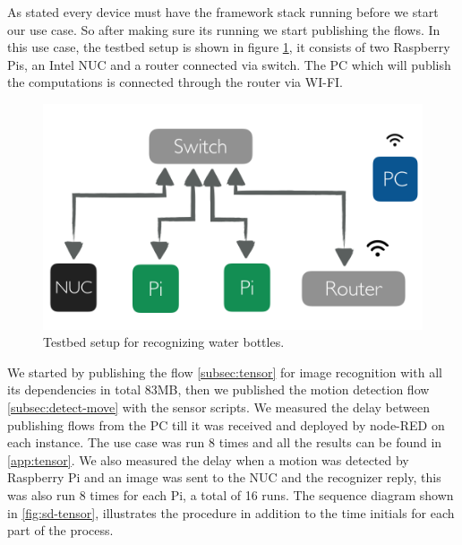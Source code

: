 \noindent As stated every device must have the framework stack running before we start our use case. So after making sure its running we start publishing the flows. In this use case, the testbed setup is shown in figure \ref{fig:tb-tensor}, it consists of two Raspberry Pis, an Intel NUC and a router connected via switch. The PC which will publish the computations is connected through the router via WI-FI. 
 \begin{figure}[H]
	\centering
	\includegraphics[scale=0.6]{images/tb-tensor.png}
	\caption{Testbed setup for recognizing water bottles.}
	\label{fig:tb-tensor}
\end{figure} 

\noindent We started by publishing the flow \ref{subsec:tensor} for  image recognition with all its dependencies in total 83MB, then we published the motion detection flow \ref{subsec:detect-move} with the sensor scripts. We measured the delay between publishing flows from the PC till it was received and deployed by node-RED on each instance. The use case was run 8 times and all the results can be found in \ref{app:tensor}. We also measured the delay when a motion was detected by Raspberry Pi and an image was sent to the NUC and the recognizer reply, this was also run 8 times for each Pi, a total of 16 runs. The sequence diagram shown in \ref{fig:sd-tensor},  illustrates the procedure in addition to the time initials for each part of the process.  \\



